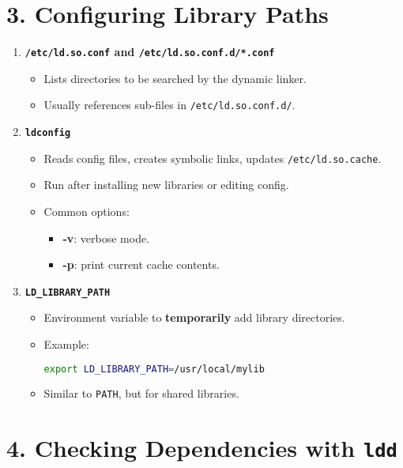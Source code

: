 \documentclass[a4paper]{report}
\begin{document}
\section*{3. Configuring Library Paths}

\begin{enumerate}
    \item \textbf{\texttt{/etc/ld.so.conf} and \texttt{/etc/ld.so.conf.d/*.conf}}
    \begin{itemize}
        \item Lists directories to be searched by the dynamic linker.
        \item Usually references sub-files in \texttt{/etc/ld.so.conf.d/}.
    \end{itemize}

    \item \textbf{\texttt{ldconfig}}
    \begin{itemize}
        \item Reads config files, creates symbolic links, updates \texttt{/etc/ld.so.cache}.
        \item Run after installing new libraries or editing config.
        \item Common options:
        \begin{itemize}
            \item \textbf{-v}: verbose mode.
            \item \textbf{-p}: print current cache contents.
        \end{itemize}
    \end{itemize}

    \item \textbf{\texttt{LD\_LIBRARY\_PATH}}
    \begin{itemize}
        \item Environment variable to \textbf{temporarily} add library directories.
        \item Example:
        \begin{lstlisting}[language=bash]
export LD_LIBRARY_PATH=/usr/local/mylib
        \end{lstlisting}
        \item Similar to \texttt{PATH}, but for shared libraries.
    \end{itemize}
\end{enumerate}

\section*{4. Checking Dependencies with \texttt{ldd}}
\end{document}
